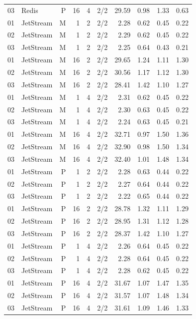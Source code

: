 \begin{longtable}{llrrrrrrrr}
03 & Redis & P & 16 & 4 & 2/2 & 29.59 & 0.98 & 1.33 & 0.63\\
01 & JetStream & M & 1 & 2 & 2/2 & 2.28 & 0.62 & 0.45 & 0.22\\
02 & JetStream & M & 1 & 2 & 2/2 & 2.29 & 0.62 & 0.45 & 0.22\\
03 & JetStream & M & 1 & 2 & 2/2 & 2.25 & 0.64 & 0.43 & 0.21\\
01 & JetStream & M & 16 & 2 & 2/2 & 29.65 & 1.24 & 1.11 & 1.30\\
02 & JetStream & M & 16 & 2 & 2/2 & 30.56 & 1.17 & 1.12 & 1.30\\
03 & JetStream & M & 16 & 2 & 2/2 & 28.41 & 1.42 & 1.10 & 1.27\\
01 & JetStream & M & 1 & 4 & 2/2 & 2.31 & 0.62 & 0.45 & 0.22\\
02 & JetStream & M & 1 & 4 & 2/2 & 2.30 & 0.63 & 0.45 & 0.22\\
03 & JetStream & M & 1 & 4 & 2/2 & 2.24 & 0.63 & 0.45 & 0.21\\
01 & JetStream & M & 16 & 4 & 2/2 & 32.71 & 0.97 & 1.50 & 1.36\\
02 & JetStream & M & 16 & 4 & 2/2 & 32.90 & 0.98 & 1.50 & 1.34\\
03 & JetStream & M & 16 & 4 & 2/2 & 32.40 & 1.01 & 1.48 & 1.34\\
01 & JetStream & P & 1 & 2 & 2/2 & 2.28 & 0.63 & 0.44 & 0.22\\
02 & JetStream & P & 1 & 2 & 2/2 & 2.27 & 0.64 & 0.44 & 0.22\\
03 & JetStream & P & 1 & 2 & 2/2 & 2.22 & 0.65 & 0.44 & 0.22\\
01 & JetStream & P & 16 & 2 & 2/2 & 28.78 & 1.32 & 1.11 & 1.29\\
02 & JetStream & P & 16 & 2 & 2/2 & 28.95 & 1.31 & 1.12 & 1.28\\
03 & JetStream & P & 16 & 2 & 2/2 & 28.37 & 1.42 & 1.10 & 1.27\\
01 & JetStream & P & 1 & 4 & 2/2 & 2.26 & 0.64 & 0.45 & 0.22\\
02 & JetStream & P & 1 & 4 & 2/2 & 2.28 & 0.64 & 0.45 & 0.22\\
03 & JetStream & P & 1 & 4 & 2/2 & 2.28 & 0.62 & 0.45 & 0.22\\
01 & JetStream & P & 16 & 4 & 2/2 & 31.67 & 1.07 & 1.47 & 1.35\\
02 & JetStream & P & 16 & 4 & 2/2 & 31.57 & 1.07 & 1.48 & 1.34\\
03 & JetStream & P & 16 & 4 & 2/2 & 31.61 & 1.09 & 1.46 & 1.33\\
\bottomrule
\end{longtable}
